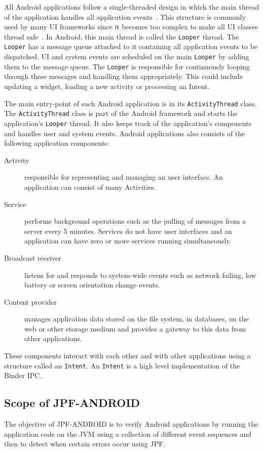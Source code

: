 \documentclass{acm_proc_article-sp}
\begin{document}
All Android applications follow a single-threaded design in which the main thread of the application handles all application
events~\cite{AndroidDocs}. This structure is commonly used by many UI frameworks since it becomes too complex to make all UI classes thread
safe~\cite{SingleThread}. In Android, this main thread is called the \texttt{Looper} thread. The \texttt{Looper} has a message queue
attached to it containing all application events to be dispatched. UI and system events are scheduled on the main \texttt{Looper} by adding
them to the message queue. The \texttt{Looper} is responsible for continuously looping through these messages and handling them
appropriately. This could include updating a widget, loading a new activity or processing an Intent.

The main entry-point of each Android application is in its \texttt{ActivityThread} class. The \texttt{ActivityThread} class is part of the
Android framework and starts the application's \texttt{Looper} thread. It also keeps track of the application's components and handles user
and system events. Android applications also consists of the following application components:
\begin{description}
\item [Activity] responsible for representing and managing an user interface. An application can consist of many
Activities.
\item [Service] performs background operations such as the pulling of messages from a server every 5 minutes. Services do not have user
interfaces and an application can have zero or more services running simultaneously.
\item [Broadcast receiver] listens for and responds to system-wide events such as network failing, low battery or screen orientation
change events.
\item [Content provider] manages application data stored on the file system, in databases, on the web or other storage medium and provides a
gateway to this data from other applications.
\end{description}

These components interact with each other and with other applications using a structure called an \texttt{Intent}. An \texttt{Intent} is a
high level implementation of the Binder IPC.

\subsection{Scope of JPF-ANDROID}
The objective of JPF-ANDROID is to verify Android applications by running the application code on the JVM using a collection of different
event sequences and then to detect when certain errors occur using JPF.
\end{document}
